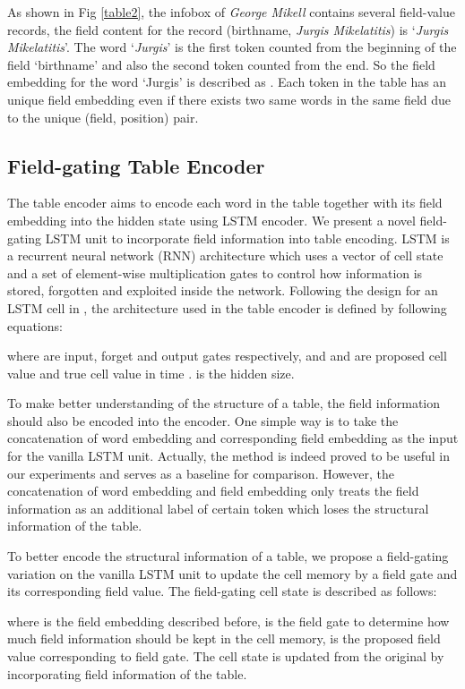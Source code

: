 \documentclass[letterpaper]{article} \usepackage{aaai18}  \usepackage{times}  \usepackage{helvet}  \usepackage{courier}  \usepackage{url}  \usepackage{graphicx}  \frenchspacing  \setlength{\pdfpagewidth}{8.5in}  \setlength{\pdfpageheight}{11in}  \usepackage{amsmath}
\begin{document}
As shown in Fig \ref{table2}, the infobox of \textit{George Mikell} contains several field-value records, the field content for the record (birthname, \textit{Jurgis Mikelatitis}) is `\textit{Jurgis Mikelatitis}'. The word `\textit{Jurgis}' is the first token counted from the beginning of the field `birthname'  and also the second token counted from the end. 
So the field embedding for the word `Jurgis' is described as .
Each token in the table has an unique field embedding even if there exists two same words in the same field due to the unique (field, position) pair. 
\subsection{Field-gating Table Encoder}
The table encoder aims to encode each word  in the table together with its field embedding  
into the hidden state  using LSTM encoder. 
We present a novel field-gating LSTM unit
to incorporate field information into table encoding.
LSTM is a recurrent neural network (RNN) architecture which uses a vector of cell state  and a set of element-wise multiplication gates to control how information is stored, forgotten and exploited inside the network. Following the design for an LSTM cell in \cite{graves2013speech} , the architecture used in the table encoder is defined by following equations: 




where  are input, forget and output gates respectively, and  and  are proposed cell value and true cell value in time .  is the hidden size. 


To make better understanding of the structure of a table, the field information should also be encoded into the encoder. 
One simple way is to take the concatenation of word embedding and corresponding field embedding as the input for the vanilla LSTM unit. Actually, the method is indeed proved to be useful in our experiments and serves as a baseline for comparison.  
However, the concatenation of word embedding and field embedding only treats the field information as an additional label of certain token which loses the structural information of the table. 

To better encode the structural information of a table, we propose a field-gating variation on the vanilla LSTM unit to update the cell memory by a field gate and its corresponding field value. The field-gating cell state is described as follows:   
 


where  is the field embedding described before,  is the field gate to determine how much field information should be kept in the cell memory,  is the proposed field value corresponding to field gate. The cell state  is updated from the original  by incorporating field information of the table.
\end{document}
